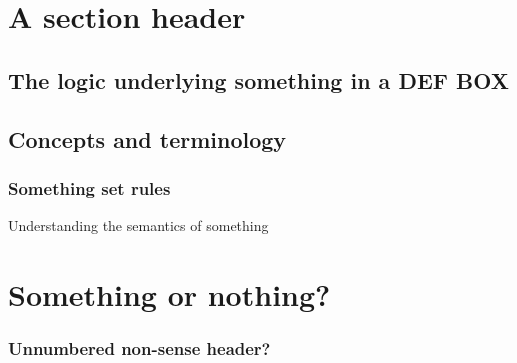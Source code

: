 \section{A section header}
\label{sec:some-ref}
	
\subsection{The logic underlying something in a DEF BOX}
\label{subsec:logicunderlying}
    	
    	
\subsection{Concepts and terminology}
\label{subsec:conceptsterm}	
		
\subsubsection*{Something set rules} 

Understanding the semantics of something

\section{Something or nothing?}
\label{sec:someornot}

\subsubsection*{Unnumbered non-sense header?}

   	
    	
    
